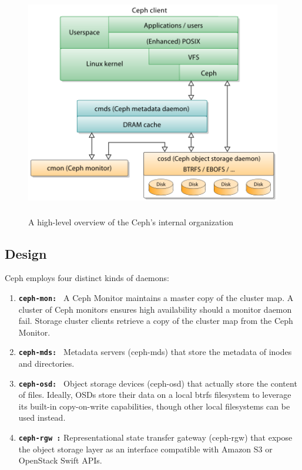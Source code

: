 \documentclass[a4paper,10pt]{article}
\begin{document}
\begin{figure}[!htb]
\includegraphics[width=12cm,height=10cm]{images/ceph1}
\caption[Long caption]{A high-level overview of the Ceph's internal organization}
\label{A high-level overview of the Ceph's internal organization}
\end{figure}

\subsection{Design}

Ceph employs four distinct kinds of daemons:
\begin{enumerate}[1]
\item  \textbf{\texttt{ceph-mon: }} A Ceph Monitor maintains a master copy of the cluster map. A cluster of Ceph monitors ensures high availability should a monitor daemon fail. Storage cluster clients retrieve a copy of the cluster map from the Ceph Monitor.

\item \textbf{\texttt{ceph-mds: }} Metadata servers (ceph-mds) that store the metadata of inodes and directories.

\item \textbf{\texttt{ceph-osd: }} Object storage devices (ceph-osd) that actually store the content of files. Ideally, OSDs store their data on a local btrfs filesystem to leverage its built-in copy-on-write capabilities, though other local filesystems can be used instead.

\item \textbf{\texttt{ceph-rgw :}} Representational state transfer gateway (ceph-rgw) that expose the object storage layer as an interface compatible with Amazon S3 or OpenStack Swift APIs.

\end{enumerate}
\end{document}
